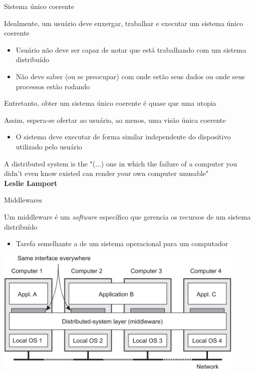 \documentclass[compress]{beamer}
\begin{document}
\begin{frame}{Sistema único coerente}

Idealmente, um usuário deve enxergar, trabalhar e executar um sistema único coerente
\begin{itemize}
    \item Usuário não deve ser capaz de notar que está trabalhando com um sistema distribuído
    \item Não deve saber (ou se preocupar) com onde estão seus dados ou onde seus processos estão rodando
\end{itemize}

\vspace{0.5cm}

Entretanto, obter um sistema único coerente é quase que uma utopia

Assim, espera-se ofertar ao usuário, ao menos, uma visão única coerente
\begin{itemize}
    \item O sistema deve executar de forma similar independente do dispositivo utilizado pelo usuário
\end{itemize}

\end{frame}


\begin{section}{A distributed system is the "(...) one in which the failure of a computer you didn't even know existed can render your own computer unusable" \\ 
\vspace{1cm}\hspace{5cm} \textbf{Leslie Lamport}}

\end{section}


\begin{frame}{Middlewares}

Um middleware é um \textit{software} específico que gerencia os recursos de um sistema distribuído
\begin{itemize}
    \item Tarefa semelhante a de um sistema operacional para um computador
\end{itemize}

\vspace{0.5cm}

\centering\includegraphics[width=0.9\textwidth]{images/middleware.png}

\end{frame}
\end{document}
